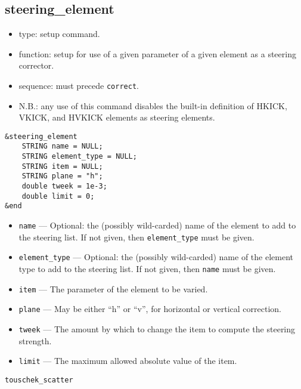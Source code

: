 \documentclass[11pt]{article}
\begin{document}
\subsection{steering\_element \label{subsec:steeringelement}}

\begin{itemize}
\item type: setup command.
\item function: setup for use of a given parameter of a given element as a steering corrector.
\item sequence: must precede \verb|correct|.
\item N.B.: any use of this command disables the built-in definition of HKICK, VKICK, and HVKICK elements
  as steering elements.
\end{itemize}

\begin{verbatim}
&steering_element
    STRING name = NULL;
    STRING element_type = NULL;
    STRING item = NULL;
    STRING plane = "h";
    double tweek = 1e-3;
    double limit = 0;
&end
\end{verbatim}

\begin{itemize}
\item \verb|name| --- Optional: the (possibly wild-carded) name of the element to add to the steering list.
        If not given, then \verb|element_type| must be given.
\item \verb|element_type| --- Optional: the (possibly wild-carded) name of the element type to add to the
        steering list.  If not given, then \verb|name| must be given.
\item \verb|item| --- The parameter of the element to be varied.
\item \verb|plane| --- May be either ``h'' or ``v'', for horizontal or vertical correction.
\item \verb|tweek| --- The amount by which to change the item to compute the steering strength.
\item \verb|limit| --- The maximum allowed absolute value of the item.
\end{itemize}

\newpage
\begin{center}{\Large\verb|touschek_scatter|}\end{center}
\end{document}
